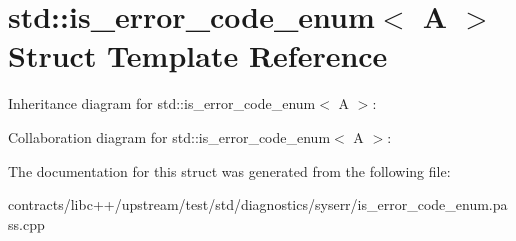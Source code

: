 \hypertarget{structstd_1_1is__error__code__enum_3_01_a_01_4}{}\section{std\+:\+:is\+\_\+error\+\_\+code\+\_\+enum$<$ A $>$ Struct Template Reference}
\label{structstd_1_1is__error__code__enum_3_01_a_01_4}


Inheritance diagram for std\+:\+:is\+\_\+error\+\_\+code\+\_\+enum$<$ A $>$\+:


Collaboration diagram for std\+:\+:is\+\_\+error\+\_\+code\+\_\+enum$<$ A $>$\+:


The documentation for this struct was generated from the following file\+:\begin{DoxyCompactItemize}
\item 
contracts/libc++/upstream/test/std/diagnostics/syserr/is\+\_\+error\+\_\+code\+\_\+enum.\+pass.\+cpp\end{DoxyCompactItemize}

